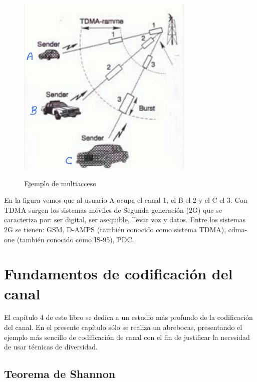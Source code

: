 \vspace{400px}
\begin{figure}[h!]
	\captionsetup{justification = raggedright, singlelinecheck = false}
	\caption{Ejemplo de multiacceso} 
	\centering
	\includegraphics[scale=1]{Imagenes/Canal-tiempo.png}
	\label{fig:Canal-tiempo}
\end{figure}

En la figura vemos que al usuario A ocupa el canal 1, el B el 2 y el C el 3. Con TDMA surgen los sistemas móviles de Segunda generación (2G) que se caracteriza por: ser digital, ser asequible, llevar voz y datos. Entre los sistemas 2G se tienen: GSM, D-AMPS (también conocido como sistema TDMA), cdma-one (también conocido como IS-95), PDC.\\


\section{Fundamentos de codificación del canal}

El capítulo 4 de este libro se dedica a un estudio más profundo de la codificación del canal. En el presente capítulo sólo se realiza un abrebocas, presentando el ejemplo más sencillo de codificación de canal con el fin de justificar la necesidad de usar técnicas de diversidad.

\subsection{Teorema de Shannon}

